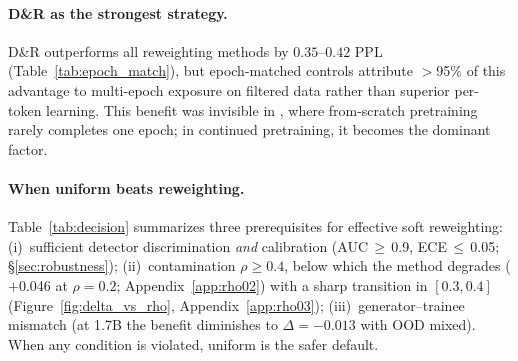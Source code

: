 \paragraph{D\&R as the strongest strategy.}
D\&R outperforms all reweighting methods by $0.35$--$0.42$ PPL (Table~\ref{tab:epoch_match}), but epoch-matched controls attribute ${>}$95\% of this advantage to multi-epoch exposure on filtered data rather than superior per-token learning.
This benefit was invisible in \citet{drayson2025detection}, where from-scratch pretraining rarely completes one epoch; in continued pretraining, it becomes the dominant factor.

\paragraph{When uniform beats reweighting.}
Table~\ref{tab:decision} summarizes three prerequisites for effective soft reweighting: (i)~sufficient detector discrimination \emph{and} calibration (AUC\,$\geq$\,0.9, ECE\,$\leq$\,0.05; \S\ref{sec:robustness}); (ii)~contamination $\rho \geq 0.4$, below which the method degrades ($+$0.046 at $\rho{=}0.2$; Appendix~\ref{app:rho02}) with a sharp transition in $[0.3, 0.4]$ (Figure~\ref{fig:delta_vs_rho}, Appendix~\ref{app:rho03}); (iii)~generator--trainee mismatch (at 1.7B the benefit diminishes to $\Delta{=}{-}0.013$ with OOD mixed).
When any condition is violated, uniform is the safer default.

\begin{table}[t]
\centering
\small
\setlength{\tabcolsep}{3pt}
\caption{Decision summary for practitioners.
$\Delta$ values are relative to uniform (positive = worse).
When any observed condition is violated, uniform is the safer default.}
\label{tab:decision}
\end{table}

